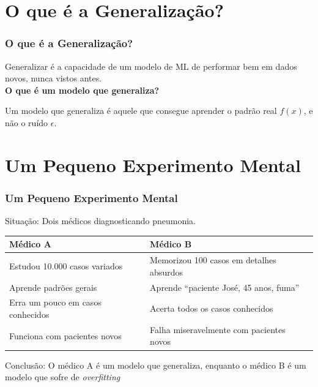 \documentclass[12pt, aspectratio=169]{beamer}
\begin{document}
\section{O que é a Generalização?}
\begin{frame}\frametitle{O que é a Generalização?}
Generalizar é a capacidade de um modelo de ML de performar bem em dados novos, nunca vistos antes.\\[1cm]
\textbf{O que é um modelo que generaliza?}
\begin{tcolorbox}[colback=gray!10, colframe=black!70, title=Definição de Generalização]
  Um modelo que generaliza é aquele que consegue aprender o padrão real $f(x)$, e não o ruído $\epsilon$.
\end{tcolorbox}
\end{frame}

\section{Um Pequeno Experimento Mental}
\begin{frame}\frametitle{Um Pequeno Experimento Mental}
Situação: Dois médicos diagnosticando pneumonia.\\[0.5cm]
\begin{table}
  \begin{tabular}{l|l}

    Médico A & Médico B \\
    \hline
    Estudou 10.000 casos variados & Memorizou 100 casos em detalhes absurdos \\
    Aprende padrões gerais & Aprende ``paciente José, 45 anos, fuma'' \\
    Erra um pouco em casos conhecidos & Acerta todos os casos conhecidos \\
    Funciona com pacientes novos & Falha miseravelmente com pacientes novos \\

  \end{tabular}
\end{table}
Conclusão: O médico A é um modelo que generaliza, enquanto o médico B é um modelo que sofre de \textit{overfitting}
\end{frame}
\end{document}
